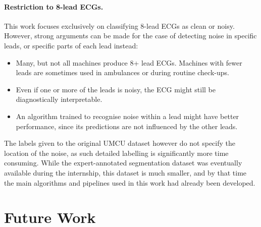 \documentclass[a4paper,10pt]{article}
\begin{document}
\paragraph{Restriction to 8-lead ECGs.} This work focuses exclusively on classifying 8-lead ECGs as clean or noisy. However, strong arguments can be made for the case of detecting noise in specific leads, or specific parts of each lead instead:
\begin{itemize}
	\item Many, but not all machines produce 8+ lead ECGs. Machines with fewer leads are sometimes used in ambulances or during routine check-ups.
	\item Even if one or more of the leads is noisy, the ECG might still be diagnostically interpretable.
	\item An algorithm trained to recognise noise within a lead might have better performance, since its predictions are not influenced by the other leads.
\end{itemize}
The labels given to the original UMCU dataset however do not specify the location of the noise, as such detailed labelling is significantly more time consuming. While the expert-annotated segmentation dataset was eventually available during the internship, this dataset is much smaller, and by that time the main algorithms and pipelines used in this work had already been developed.


\section{Future Work}
\end{document}
